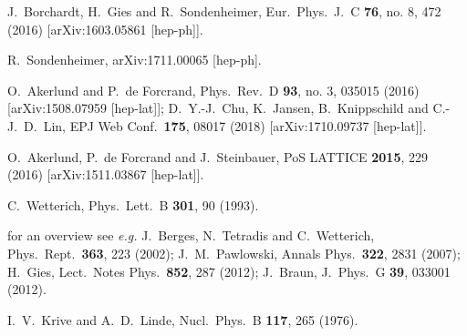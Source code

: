 \documentclass[aps,prd,11pt,tightenlines,superscriptaddress,nofootinbib,preprintnumbers,notitlepage]{revtex4-1}
\newcommand{\eg}{\textsl{e.g.}\;}
\begin{document}
\begin{thebibliography}{99}
  J.~Borchardt, H.~Gies and R.~Sondenheimer,
  Eur.\ Phys.\ J.\ C {\bf 76}, no. 8, 472 (2016)
  [arXiv:1603.05861 [hep-ph]].
  
  R.~Sondenheimer,
  arXiv:1711.00065 [hep-ph].

  O.~Akerlund and P.~de Forcrand,
  Phys.\ Rev.\ D {\bf 93}, no. 3, 035015 (2016)
  [arXiv:1508.07959 [hep-lat]];
  D.~Y.-J.~Chu, K.~Jansen, B.~Knippschild and C.-J.~D.~Lin,
  EPJ Web Conf.\  {\bf 175}, 08017 (2018)
  [arXiv:1710.09737 [hep-lat]].
  
  O.~Akerlund, P.~de Forcrand and J.~Steinbauer,
  PoS LATTICE {\bf 2015}, 229 (2016)
  [arXiv:1511.03867 [hep-lat]].

  C.~Wetterich,
  Phys.\ Lett.\ B {\bf 301}, 90 (1993).

for an overview see \eg
  J.~Berges, N.~Tetradis and C.~Wetterich,
  Phys.\ Rept.\  {\bf 363}, 223 (2002);
  J.~M.~Pawlowski,
  Annals Phys.\  {\bf 322}, 2831 (2007);
  H.~Gies,
  Lect.\ Notes Phys.\  {\bf 852}, 287 (2012);
  J.~Braun,
  J.\ Phys.\ G {\bf 39}, 033001 (2012).
  
  I.~V.~Krive and A.~D.~Linde,
  Nucl.\ Phys.\ B {\bf 117}, 265 (1976).


\end{thebibliography}
\end{document}
